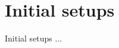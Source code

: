 
\clearpage %

\section*{Initial setups}
\label{sec:Appendix/Initial setups}
Initial setups ...









